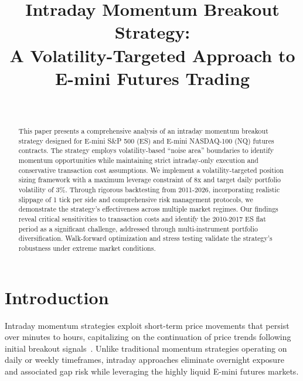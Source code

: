 \documentclass[twocolumn,ieee]{arithmaxresearch}
\begin{document}
\title{Intraday Momentum Breakout Strategy: \\
A Volatility-Targeted Approach to E-mini Futures Trading}

\author{
\\
\vspace{0.5em}
}

\maketitle

\begin{center}
\vspace{-1em}
\arithmaxtitlelogo[4cm]
\vspace{0.5em}
\end{center}

\begin{abstract}
This paper presents a comprehensive analysis of an intraday momentum breakout strategy designed for E-mini S\&P 500 (ES) and E-mini NASDAQ-100 (NQ) futures contracts. The strategy employs volatility-based ``noise area'' boundaries to identify momentum opportunities while maintaining strict intraday-only execution and conservative transaction cost assumptions. We implement a volatility-targeted position sizing framework with a maximum leverage constraint of 8x and target daily portfolio volatility of 3\%. Through rigorous backtesting from 2011-2026, incorporating realistic slippage of 1 tick per side and comprehensive risk management protocols, we demonstrate the strategy's effectiveness across multiple market regimes. Our findings reveal critical sensitivities to transaction costs and identify the 2010-2017 ES flat period as a significant challenge, addressed through multi-instrument portfolio diversification. Walk-forward optimization and stress testing validate the strategy's robustness under extreme market conditions.
\end{abstract}

\section{Introduction}

Intraday momentum strategies exploit short-term price movements that persist over minutes to hours, capitalizing on the continuation of price trends following initial breakout signals~\cite{jegadeesh1993momentum}. Unlike traditional momentum strategies operating on daily or weekly timeframes, intraday approaches eliminate overnight exposure and associated gap risk while leveraging the highly liquid E-mini futures markets.
\end{document}

